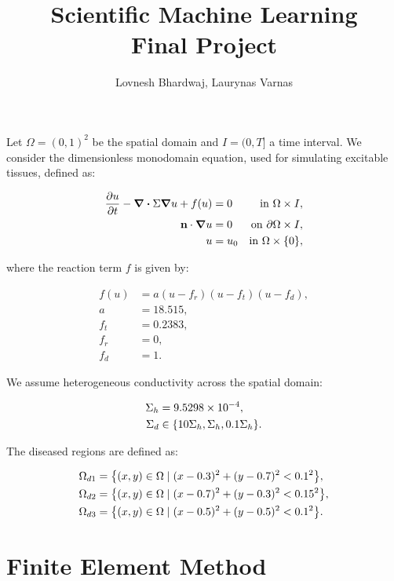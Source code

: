 \documentclass[unicode,11pt,a4paper,oneside,numbers=endperiod,openany]{article}
\title{Scientific Machine Learning \\ Final Project}
\author{Lovnesh Bhardwaj, Laurynas Varnas}
\date{}
\begin{document}
\maketitle

\noindent
Let $\Omega = (0, 1)^2$ be the spatial domain and $I = (0, T]$ a time interval.
We consider the dimensionless monodomain equation, used for simulating
excitable tissues, defined as:

\begin{align*}
	\pdv{u}{t} - \divergence \Sigma \grad u + f(u) & = 0   & \text{in } \Omega \times I,          \\
	\mathbf{n} \cdot \grad u                       & = 0   & \text{on } \partial \Omega \times I, \\
	u                                              & = u_0 & \text{in } \Omega \times \{0\},
\end{align*}

where the reaction term $f$ is given by:

\begin{align*}
	f(u) & = a(u - f_r)(u - f_t)(u - f_d), \\
	a    & = 18.515,                       \\
	f_t  & = 0.2383,                       \\
	f_r  & = 0,                            \\
	f_d  & = 1.
\end{align*}

We assume heterogeneous conductivity across the spatial domain:

\begin{align*}
	\Sigma_h & = 9.5298 \times 10^{-4},                       \\
	\Sigma_d & \in \qty{ 10\Sigma_h, \Sigma_h, 0.1\Sigma_h }.
\end{align*}

The diseased regions are defined as:

\begin{align*}
	\Omega_{d1} & = \qty{ (x, y) \in \Omega \mid (x - 0.3)^2 + (y - 0.7)^2 < 0.1^2 },  \\
	\Omega_{d2} & = \qty{ (x, y) \in \Omega \mid (x - 0.7)^2 + (y - 0.3)^2 < 0.15^2 }, \\
	\Omega_{d3} & = \qty{ (x, y) \in \Omega \mid (x - 0.5)^2 + (y - 0.5)^2 < 0.1^2 }.
\end{align*}

\section{Finite Element Method}
\end{document}

